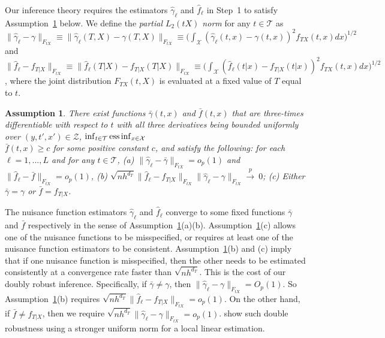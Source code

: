 \documentclass[lettersize, 12pt]{article}
\newtheorem{assumption}{Assumption}
\begin{document}
Our inference theory requires the estimators $\hat\gamma_\ell$ and $\hat f_\ell$ in Step~1 to satisfy Assumption~\ref{A1st} below.
We define the {\it partial $L_2(tX)$ norm} for any $t\in \mathcal{T}$ as 
$\|\hat\gamma_\ell-\gamma\|_{F_{tX}} \equiv \|\hat\gamma_\ell(T,X)-\gamma(T,X)\|_{F_{tX}} \equiv 
\big(\int_{\mathcal{X}} (\hat \gamma_\ell(t,x) - \gamma(t,x))^2 f_{TX}(t,x) dx \big)^{1/2}$
and 
$\|\hat f_\ell -f_{T|X}\|_{F_{tX}} \equiv \|\hat f_\ell(T|X)- f_{T|X}(T|X)\|_{F_{tX}} \equiv 
\big(\int_{\mathcal{X}} (\hat f_\ell(t|x) - f_{T|X}(t|x))^2 f_{TX}(t, x) dx \big)^{1/2}$,
where the joint distribution $F_{TX}(t,X)$ is evaluated at a fixed value of $T$ equal to $t$.

\begin{assumption}
There exist functions $\bar \gamma(t,x)$ and $\bar f(t,x)$ that 
are three-times differentiable with respect to $t$ with all
three derivatives being bounded uniformly over $(y,t',x') \in\mathcal{Z}$,
$\inf_{t\in\mathcal{T}}{\rm ess}\inf_{x\in\mathcal{X}}
 $\\$\bar f(t,x) \geq c$ for some positive constant $c$, and satisfy the following: 
for each $\ell= 1,...,L$ and for any $t \in \mathcal{T}$,
 {\it (a)} $\big\|\hat \gamma_\ell - \bar\gamma \big\|_{F_{tX}} = o_p(1)$ and 
$\big\|\hat f_\ell - \bar{f} \big\|_{F_{tX}} = o_p(1)$,
{\it (b)} $\sqrt{nh^{d_T}} \big\| \hat f_\ell - {f}_{T|X} \big\|_{F_{tX}}  \big\| \hat\gamma_\ell - \gamma\big\|_{F_{tX}}  \stackrel{p}{\rightarrow}~0$;
{\it (c)} Either $\bar \gamma = \gamma$ or $\bar{f} = f_{T|X}$.
\label{A1st}
\end{assumption}

The nuisance function estimators $\hat\gamma_\ell$ and $\hat f_\ell$ converge to some fixed functions $\bar\gamma$ and $\bar f$ respectively in the sense of Assumption~\ref{A1st}(a)(b). 
Assumption~\ref{A1st}(c) allows one of the nuisance functions to be misspecified, 
or requires at least one of the nuisance function estimators to be consistent.
Assumption~\ref{A1st}(b) and (c) imply that if one nuisance function is misspecified, then the other needs to be estimated consistently at a convergence rate faster than $\sqrt{nh^{d_T}}$.
This is the cost of our doubly robust inference.
Specifically, 
if $\bar\gamma \neq \gamma$, then $\|\hat\gamma_\ell - \gamma\|_{F_{tX}} = O_p(1)$.  So  Assumption~\ref{A1st}(b) requires $\sqrt{n h^{d_T}} \|\hat f_{\ell} - f_{T|X}\|_{F_{tX}} = o_p(1)$.
On the other hand, if $\bar f \neq f_{T|X}$, then we require $\sqrt{n h^{d_T}} \|\hat \gamma_{\ell} - \gamma\|_{F_{tX}} = o_p(1)$.
\cite{Kennedy} show such double robustness using a stronger uniform norm for a local linear estimation.
\end{document}
